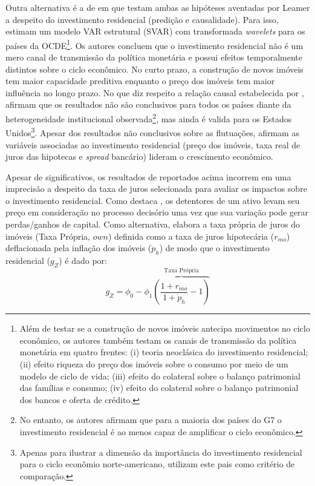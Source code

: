 Outra alternativa é a de \textcite{huang_is_2018} em que testam ambas as hipóteses aventadas por Leamer a despeito do investimento residencial (predição e causalidade). Para isso, estimam um modelo VAR estrutural (SVAR) com transformada \textit{wavelets} para os países da OCDE\footnote{
	Além de testar se a construção de novos imóveis antecipa movimentos no ciclo econômico, os autores também testam os canais de transmissão da política monetária em quatro frentes: (i) teoria neoclásica do investimento residencial; (ii) efeito riqueza do preço dos imóveis sobre o consumo por meio de um modelo de ciclo de vida; (iii) efeito do colateral sobre o balanço patrimonial das famílias e consumo; (iv) efeito do colateral sobre o balanço patrimonial dos bancos e oferta de crédito.}.  
Os autores concluem que o investimento residencial não é um mero canal de transmissão da política monetária e possui efeitos temporalmente distintos sobre o ciclo econômico. No curto prazo, a construção de novos imóveis tem maior capacidade preditiva enquanto o preço dos imóveis tem maior influência no longo prazo. No que diz respeito a relação causal estabelecida por \textcite{leamer_housing_2007}, afirmam que os resultados não são conclusivos para todos os países diante da heterogeneidade institucional observada\footnote{
	No entanto, os autores afirmam que para a maioria dos países do G7 o investimento residencial é ao menos capaz de amplificar o ciclo econômico.}, mas ainda é valida para os Estados Unidos\footnote{
	Apenas para ilustrar a dimensão da importância do investimento residencial para o ciclo econômio norte-americano, \textcite{huang_is_2018} utilizam este pais como critério de comparação.}.
Apesar dos resultados não conclusivos sobre as flutuações, afirmam as variáveis associadas ao investimento residencial (preço dos imóveis, taxa real de juros das hipotecas e \textit{spread} bancário) lideram o crescimento econômico.

Apesar de significativos, os resultados  de \textcite{huang_is_2018} reportados acima incorrem em uma imprecisão a despeito da taxa de juros selecionada para avaliar os impactos sobre o investimento residencial. Como destaca \textcite[p.~53]{teixeira_crescimento_2015}, os detentores de um ativo levam seu preço em consideração no processo decisório uma vez que sua variação pode gerar perdas/ganhos de capital. Como alternativa, elabora a taxa própria de juros do imóveis (Taxa Própria, $own$) definida como a taxa de juros hipotecária ($r_{mo}$) deflacionada pela inflação dos imóveis ({$\dot p_h$}) de modo que o investimento residencial ($g_Z$) é dado por:
$$
g_Z = \phi_0 - \phi_1 \overbrace{\left(\frac{1+r_{mo}}{1+\dot p_h} - 1\right)}^{\text{Taxa Própria}}
$$

